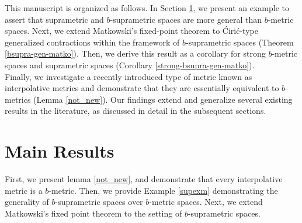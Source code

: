 \documentclass[pdflatex,sn-mathphys-num]{sn-jnl}%
\theoremstyle{thmstyleone}%
\theoremstyle{thmstyletwo}%
\theoremstyle{thmstylethree}%
\begin{document}
This manuscript is organized as follows. In Section \ref{mr}, we present an example to assert that suprametric and \( b \)-suprametric spaces are more general than \( b \)-metric spaces. Next, we extend Matkowski's fixed-point theorem to Ćirić-type generalized contractions within the framework of \( b \)-suprametric spaces (Theorem \ref{bsupra-gen-matko}). Then, we derive this result as a corollary for strong \( b \)-metric spaces and suprametric spaces (Corollary \ref{strong-bsupra-gen-matko}). \\
 Finally, we investigate a recently introduced type of metric known as interpolative metrics and demonstrate that they are essentially equivalent to \( b \)-metrics (Lemma \ref{not_new}). Our findings extend and generalize several existing results in the literature, as discussed in detail in the subsequent sections.
\section{Main Results}\label{mr}
First, we present  lemma \ref{not_new}, and demonstrate that every interpolative metric is a \(b\)-metric. Then, we provide Example \ref{supexm} demonstrating the generality of \( b \)-suprametric spaces over \( b \)-metric spaces. Next, we extend Matkowski's fixed point theorem to the setting of \( b \)-suprametric spaces. 
\end{document}
